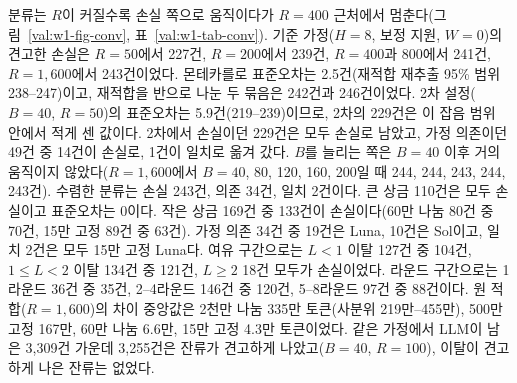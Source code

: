 분류는 $R$이 커질수록 손실 쪽으로 움직이다가 $R=400$ 근처에서 멈춘다(그림~\ref{val:w1-fig-conv}, 표~\ref{val:w1-tab-conv}). 기준 가정($H=8$, 보정 지원, $W=0$)의 견고한 손실은 $R=50$에서 227건, $R=200$에서 239건, $R=400$과 $800$에서 241건, $R=1{,}600$에서 243건이었다. 몬테카를로 표준오차는 2.5건(재적합 재추출 95\% 범위 238--247)이고, 재적합을 반으로 나눈 두 묶음은 242건과 246건이었다. 2차 설정($B=40$, $R=50$)의 표준오차는 5.9건(219--239)이므로, 2차의 229건은 이 잡음 범위 안에서 적게 센 값이다. 2차에서 손실이던 229건은 모두 손실로 남았고, 가정 의존이던 49건 중 14건이 손실로, 1건이 일치로 옮겨 갔다. $B$를 늘리는 쪽은 $B=40$ 이후 거의 움직이지 않았다($R=1{,}600$에서 $B=40$, 80, 120, 160, 200일 때 244, 244, 243, 244, 243건). 수렴한 분류는 손실 243건, 의존 34건, 일치 2건이다. 큰 상금 110건은 모두 손실이고 표준오차는 0이다. 작은 상금 169건 중 133건이 손실이다(60만 나눔 80건 중 70건, 15만 고정 89건 중 63건). 가정 의존 34건 중 19건은 Luna, 10건은 Sol이고, 일치 2건은 모두 15만 고정 Luna다. 여유 구간으로는 $L<1$ 이탈 127건 중 104건, $1\le L<2$ 이탈 134건 중 121건, $L\ge 2$ 18건 모두가 손실이었다. 라운드 구간으로는 1라운드 36건 중 35건, 2--4라운드 146건 중 120건, 5--8라운드 97건 중 88건이다. 원 적합($R=1{,}600$)의 차이 중앙값은 2천만 나눔 335만 토큰(사분위 219만--455만), 500만 고정 167만, 60만 나눔 6.6만, 15만 고정 4.3만 토큰이었다. 같은 가정에서 LLM이 남은 3,309건 가운데 3,255건은 잔류가 견고하게 나았고($B=40$, $R=100$), 이탈이 견고하게 나은 잔류는 없었다.

